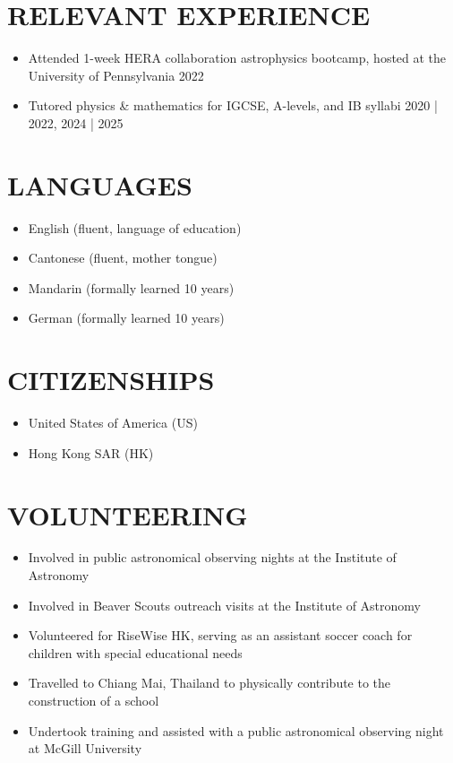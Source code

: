 \documentclass[a4paper,10pt]{extarticle}
\begin{document}
\section*{RELEVANT EXPERIENCE}
\begin{itemize}
    \item Attended 1-week HERA collaboration astrophysics bootcamp, hosted at the University of Pennsylvania \hfill 2022

    \item Tutored physics \& mathematics for IGCSE, A-levels, and IB syllabi \hfill 2020 | 2022, 2024 | 2025
\end{itemize}


\section*{LANGUAGES}
\begin{itemize}
    \item English (fluent, language of education)

    \item Cantonese (fluent, mother tongue)

    \item Mandarin (formally learned 10 years)

    \item German (formally learned 10 years)
\end{itemize}

\section*{CITIZENSHIPS}
\begin{itemize}
    \item United States of America (US)

    \item Hong Kong SAR (HK)
\end{itemize}


\section*{VOLUNTEERING}
\begin{itemize}
    \item Involved in public astronomical observing nights at the Institute of Astronomy

    \item Involved in Beaver Scouts outreach visits at the Institute of Astronomy

    \item Volunteered for RiseWise HK, serving as an assistant soccer coach for children with special educational needs

    \item Travelled to Chiang Mai, Thailand to physically contribute to the construction of a school

    \item Undertook training and assisted with a public astronomical observing night at McGill University
\end{itemize}
\end{document}
